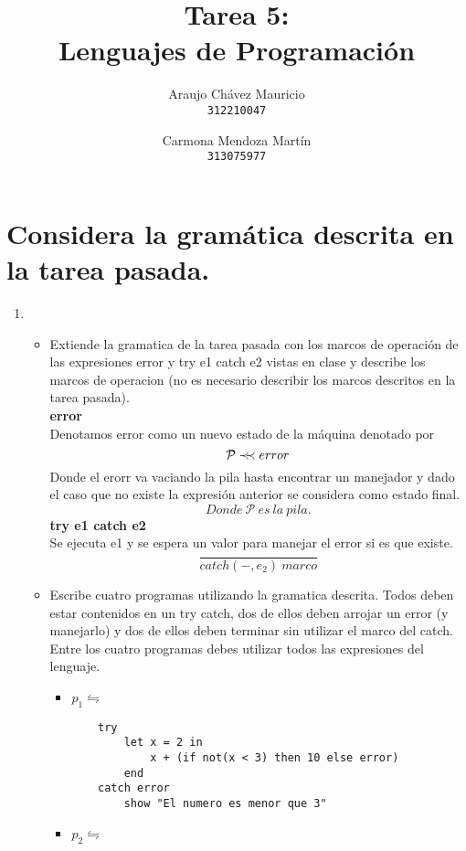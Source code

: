 \documentclass[11pt, a4paper]{report}
\newcommand{\precprec}{\prec\mathrel{\mkern-5mu}\prec}
\begin{document}
\title{Tarea 5: \\Lenguajes de Programaci\'on}
\author{
  Araujo Chávez Mauricio\\
  \texttt{312210047}
  \and
  Carmona Mendoza Mart\'in\\
  \texttt{313075977}
}
\date{}
\maketitle

\section*{Considera la gramática descrita en la tarea pasada.}
\begin{enumerate}
	\item 
		\begin{itemize}
		 	\item Extiende la gramatica de la tarea pasada con los marcos de operación de las expresiones error y try e1 catch e2 vistas en clase y describe los marcos de operacion (no es necesario describir los marcos descritos en la tarea pasada).
		 	\\\textbf{error}
		 	\\Denotamos error como un nuevo estado de la máquina denotado por
		 	$$ \mathcal{P} \precprec error$$
		 	Donde el erorr va vaciando la pila hasta encontrar un manejador y dado el caso que no existe la expresión anterior se considera como estado final.
		 	$$ Donde\ \mathcal{P}\ es\ la\ pila.$$
		 	\textbf{try e1 catch e2}
		 	\\Se ejecuta e1 y se espera un valor para manejar el error si es que existe.
		 	$$ \frac{}{catch(-,e_{2})\ marco} $$
		 	\item Escribe cuatro programas utilizando la gramatica descrita. Todos deben estar contenidos en un try catch, dos de ellos deben arrojar un error (y manejarlo) y dos de ellos deben terminar sin utilizar el marco del catch. Entre los cuatro programas debes utilizar todos las expresiones del lenguaje.
		 		\begin{itemize}
		 			\item $p_{1} \leftrightharpoons$
		 			\begin{lstlisting}
	try
		let x = 2 in
			x + (if not(x < 3) then 10 else error)
		end
	catch error
		show "El numero es menor que 3"
		 			\end{lstlisting}
		 			\item $p_{2} \leftrightharpoons$
		 			\begin{lstlisting}[mathescape=true]

\end{lstlisting}
\end{itemize}
\end{itemize}
\end{enumerate}
\end{document}
